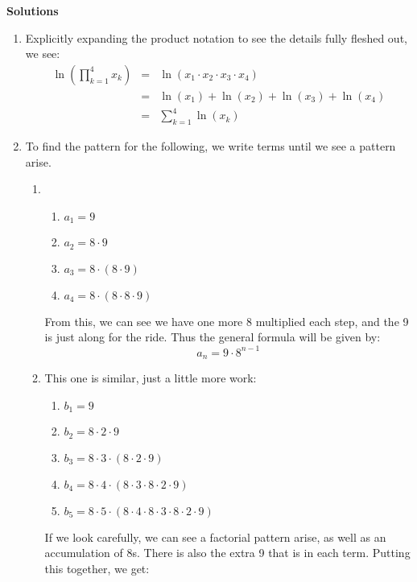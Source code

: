 \documentclass{article}
\begin{document}
    \newpage
    \begin{center}
        \textbf{\Large{Solutions}}
    \end{center}
    \begin{enumerate}
        \item Explicitly expanding the product notation to see the details fully fleshed out, we see:
        \begin{eqnarray*}
        \ln\left(\prod_{k=1}^4 x_k\right) &=& \ln(x_1\cdot x_2\cdot x_3\cdot x_4) \\[1em]
        &=& \ln(x_1) + \ln(x_2) + \ln(x_3) + \ln(x_4) \\[1em]
        &=& \sum_{k=1}^4 \ln(x_k)
        \end{eqnarray*}
        \item To find the pattern for the following, we write terms until we see a pattern arise.
        \begin{enumerate}
            \item  
            \begin{enumerate}[label=(\roman*)]
                \item $a_1=9$
                \item $a_2 = 8\cdot 9$
                \item $a_3=8\cdot (8\cdot 9)$
                \item $a_4= 8 \cdot (8\cdot 8\cdot 9)$
            \end{enumerate}
            From this, we can see we have one more 8 multiplied each step, and the 9 is just along for the ride.  Thus the general formula will be given by:
            \[a_n=9\cdot 8^{n-1}\]
            \item This one is similar, just a little more work:
            \begin{enumerate}
                \item $b_1=9$
                \item $b_2=8\cdot 2\cdot 9$
                \item $b_3=8\cdot 3\cdot (8\cdot 2\cdot 9)$
                \item $b_4=8\cdot 4 \cdot (8\cdot 3 \cdot 8 \cdot 2\cdot 9)$
                \item $b_5=8\cdot 5\cdot(8\cdot 4 \cdot 8\cdot 3 \cdot 8 \cdot 2\cdot 9)$
            \end{enumerate}
            If we look carefully, we can see a factorial pattern arise, as well as an accumulation of 8s.  There is also the extra 9 that is in each term.  Putting this together, we get:

\end{enumerate}
\end{enumerate}
\end{document}
